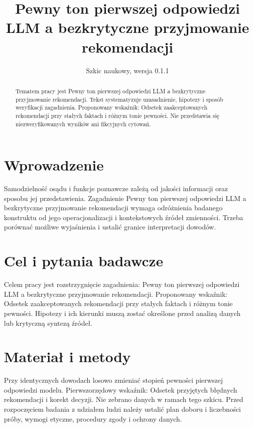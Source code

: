 \documentclass[11pt,a4paper]{article}
\title{Pewny ton pierwszej odpowiedzi LLM a bezkrytyczne przyjmowanie rekomendacji}
\author{}
\date{Szkic naukowy, wersja 0.1.1}
\begin{document}
\maketitle

\begin{abstract}

Tematem pracy jest Pewny ton pierwszej odpowiedzi LLM a bezkrytyczne przyjmowanie rekomendacji. Tekst systematyzuje uzasadnienie, hipotezy i sposób weryfikacji zagadnienia. Proponowany wskaźnik: Odsetek zaakceptowanych rekomendacji przy stałych faktach i różnym tonie pewności. Nie przedstawia się niezweryfikowanych wyników ani fikcyjnych cytowań.

\end{abstract}

\section{Wprowadzenie}

Samodzielność osądu i funkcje poznawcze zależą od jakości informacji oraz sposobu jej przedstawienia. Zagadnienie Pewny ton pierwszej odpowiedzi LLM a bezkrytyczne przyjmowanie rekomendacji wymaga odróżnienia badanego konstruktu od jego operacjonalizacji i kontekstowych źródeł zmienności. Trzeba porównać możliwe wyjaśnienia i ustalić granice interpretacji dowodów.

\section{Cel i pytania badawcze}

Celem pracy jest rozstrzygnięcie zagadnienia: Pewny ton pierwszej odpowiedzi LLM a bezkrytyczne przyjmowanie rekomendacji. Proponowany wskaźnik: Odsetek zaakceptowanych rekomendacji przy stałych faktach i różnym tonie pewności. Hipotezy i ich kierunki muszą zostać określone przed analizą danych lub krytyczną syntezą źródeł.

\section{Materiał i metody}

Przy identycznych dowodach losowo zmieniać stopień pewności pierwszej odpowiedzi modelu. Pierwszorzędowy wskaźnik: Odsetek przyjętych błędnych rekomendacji i korekt decyzji. Nie zebrano danych w ramach tego szkicu. Przed rozpoczęciem badania z udziałem ludzi należy ustalić plan doboru i liczebności próby, wymogi etyczne, procedury zgody i ochrony danych.
\end{document}
